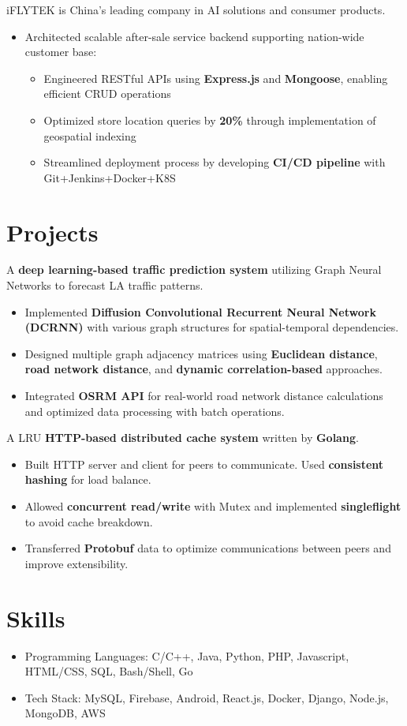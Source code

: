 \documentclass{resume}
\begin{document}
  iFLYTEK is China's leading company in AI solutions and consumer products.
\begin{itemize}
  \item Architected scalable after-sale service backend supporting nation-wide customer base:
  \begin{itemize}
    \item Engineered RESTful APIs using \textbf{Express.js} and \textbf{Mongoose}, enabling efficient CRUD operations
    \item Optimized store location queries by \textbf{20\%} through implementation of geospatial indexing
    \item Streamlined deployment process by developing \textbf{CI/CD pipeline} with Git+Jenkins+Docker+K8S
  \end{itemize}
\end{itemize}

\section{Projects}

A \textbf{deep learning-based traffic prediction system} utilizing Graph Neural Networks to forecast LA traffic patterns.
\begin{itemize}
\item Implemented \textbf{Diffusion Convolutional Recurrent Neural Network (DCRNN)} with various graph structures for spatial-temporal dependencies.
\item Designed multiple graph adjacency matrices using \textbf{Euclidean distance}, \textbf{road network distance}, and \textbf{dynamic correlation-based} approaches.
\item Integrated \textbf{OSRM API} for real-world road network distance calculations and optimized data processing with batch operations.
\end{itemize}

  A LRU \textbf{HTTP-based distributed cache system} written by \textbf{Golang}.
\begin{itemize}
  \item Built HTTP server and client for peers to communicate. Used \textbf{consistent hashing} for load balance.
  \item Allowed \textbf{concurrent read/write} with Mutex and implemented \textbf{singleflight} to avoid cache breakdown.
  \item Transferred \textbf{Protobuf} data to optimize communications between peers and improve extensibility.
\end{itemize}



\section{Skills}
\begin{itemize}[parsep=0.5ex]
  \item Programming Languages: C/C++, Java, Python, PHP, Javascript, HTML/CSS, SQL, Bash/Shell, Go
  \item Tech Stack: MySQL, Firebase, Android, React.js, Docker, Django, Node.js, MongoDB, AWS
\end{itemize}
\end{document}
